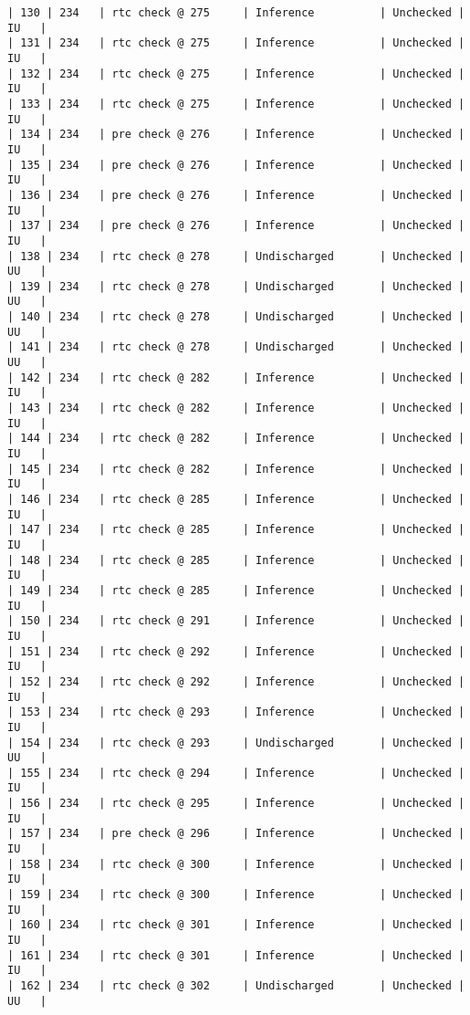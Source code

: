 \begin{lstlisting}[frame=single, gobble=0, caption={POGS report for PCA Pump prototype}]
| 130 | 234   | rtc check @ 275     | Inference          | Unchecked |   IU   |
| 131 | 234   | rtc check @ 275     | Inference          | Unchecked |   IU   |
| 132 | 234   | rtc check @ 275     | Inference          | Unchecked |   IU   |
| 133 | 234   | rtc check @ 275     | Inference          | Unchecked |   IU   |
| 134 | 234   | pre check @ 276     | Inference          | Unchecked |   IU   |
| 135 | 234   | pre check @ 276     | Inference          | Unchecked |   IU   |
| 136 | 234   | pre check @ 276     | Inference          | Unchecked |   IU   |
| 137 | 234   | pre check @ 276     | Inference          | Unchecked |   IU   |
| 138 | 234   | rtc check @ 278     | Undischarged       | Unchecked |   UU   |
| 139 | 234   | rtc check @ 278     | Undischarged       | Unchecked |   UU   |
| 140 | 234   | rtc check @ 278     | Undischarged       | Unchecked |   UU   |
| 141 | 234   | rtc check @ 278     | Undischarged       | Unchecked |   UU   |
| 142 | 234   | rtc check @ 282     | Inference          | Unchecked |   IU   |
| 143 | 234   | rtc check @ 282     | Inference          | Unchecked |   IU   |
| 144 | 234   | rtc check @ 282     | Inference          | Unchecked |   IU   |
| 145 | 234   | rtc check @ 282     | Inference          | Unchecked |   IU   |
| 146 | 234   | rtc check @ 285     | Inference          | Unchecked |   IU   |
| 147 | 234   | rtc check @ 285     | Inference          | Unchecked |   IU   |
| 148 | 234   | rtc check @ 285     | Inference          | Unchecked |   IU   |
| 149 | 234   | rtc check @ 285     | Inference          | Unchecked |   IU   |
| 150 | 234   | rtc check @ 291     | Inference          | Unchecked |   IU   |
| 151 | 234   | rtc check @ 292     | Inference          | Unchecked |   IU   |
| 152 | 234   | rtc check @ 292     | Inference          | Unchecked |   IU   |
| 153 | 234   | rtc check @ 293     | Inference          | Unchecked |   IU   |
| 154 | 234   | rtc check @ 293     | Undischarged       | Unchecked |   UU   |
| 155 | 234   | rtc check @ 294     | Inference          | Unchecked |   IU   |
| 156 | 234   | rtc check @ 295     | Inference          | Unchecked |   IU   |
| 157 | 234   | pre check @ 296     | Inference          | Unchecked |   IU   |
| 158 | 234   | rtc check @ 300     | Inference          | Unchecked |   IU   |
| 159 | 234   | rtc check @ 300     | Inference          | Unchecked |   IU   |
| 160 | 234   | rtc check @ 301     | Inference          | Unchecked |   IU   |
| 161 | 234   | rtc check @ 301     | Inference          | Unchecked |   IU   |
| 162 | 234   | rtc check @ 302     | Undischarged       | Unchecked |   UU   |

\end{lstlisting}
